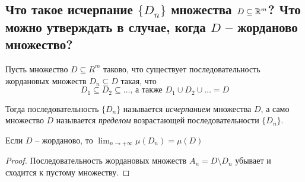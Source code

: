 \subsection{Что такое исчерпание $\{D_n\}$ множества $D \subseteq \mathbb{R}^m$? Что можно утверждать в случае, когда $D$ -- жорданово множество?}

Пусть множество $D \subseteq R^m$ таково, что существует последовательность жордановых множеств $D_n \subseteq D$ такая, что
\[ D_1 \subseteq D_2 \subseteq \dots \text{, а также } D_1 \cup D_2 \cup \dots = D \]

Тогда последовательность $\{ D_n\}$ называется \textit{исчерпанием} множества $D$, а само множество $D$ называется \textit{пределом} возрастающей
последовательности $\{D_n\}$.

\begin{theorem*}
    Если $D$ -- жорданово, то $\lim_{n \to +\infty} \mu(D_n) = \mu(D)$
\end{theorem*}

\begin{proof}
    Последовательность жордановых множеств $A_n = D \setminus D_n$ убывает и сходится к пустому множеству.
\end{proof}